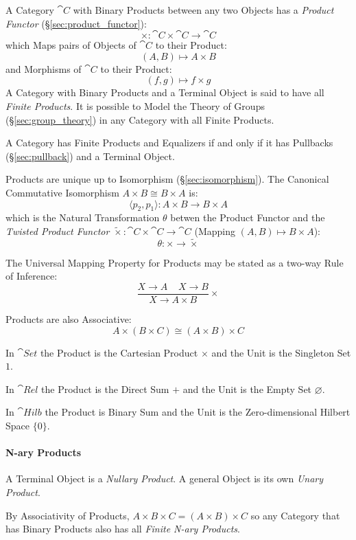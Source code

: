 A Category $\cat{C}$ with Binary Products between any two Objects
has a \emph{Product Functor} (\S\ref{sec:product_functor}):
\[
  \times : \cat{C} \times \cat{C} \rightarrow \cat{C}
\]
which Maps pairs of Objects of $\cat{C}$ to their Product:
\[
  (A,B) \mapsto A \times B
\]
and Morphisms of $\cat{C}$ to their Product:
\[
  (f,g) \mapsto f \times g
\]
A Category with Binary Products and a Terminal Object is said to have
all \emph{Finite Products}. It is possible to Model the Theory of
Groups (\S\ref{sec:group_theory}) in any Category with all Finite
Products.

A Category has Finite Products and Equalizers if and only if it has
Pullbacks (\S\ref{sec:pullback}) and a Terminal Object. \cite{awodey06}

Products are unique up to Isomorphism (\S\ref{sec:isomorphism}). The
Canonical Commutative Isomorphism $A \times B \cong B \times A$ is:
\[
  \langle p_2, p_1 \rangle : A \times B \rightarrow B \times A
\]
which is the Natural Transformation $\theta$ betwen the Product
Functor and the \emph{Twisted Product Functor} $\tilde{\times} :
\cat{C} \times \cat{C} \rightarrow \cat{C}$ (Mapping $(A,B)
\mapsto B \times A$):
\[
  \theta : \times \rightarrow \tilde{\times}
\]

The Universal Mapping Property for Products may be stated as a two-way
Rule of Inference:
\[
  {
    \frac{X \rightarrow A \;\;\;\; X \rightarrow B}
    {X \rightarrow A \times B}
  }\times
\]

Products are also Associative:
\[
  A \times (B \times C) \cong (A \times B) \times C
\]

In $\cat{Set}$ the Product is the Cartesian Product $\times$ and the
Unit is the Singleton Set $1$.

In $\cat{Rel}$ the Product is the Direct Sum $+$ and the Unit is
the Empty Set $\varnothing$.

In $\cat{Hilb}$ the Product is Binary Sum and the Unit is the
Zero-dimensional Hilbert Space $\{ 0 \}$. %



\paragraph{N-ary Products}\label{sec:category_nary}\hfill
A Terminal Object is a \emph{Nullary Product}. A general Object is its
own \emph{Unary Product}.

By Associativity of Products, $A \times B \times C = (A \times B)
\times C$ so any Category that has Binary Products also has all
\emph{Finite N-ary Products}.



